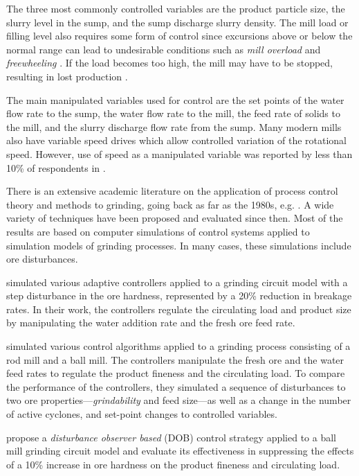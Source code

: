 The three most commonly controlled variables are the product particle size, the slurry level in the sump, and the sump discharge slurry density. The mill load or filling level also requires some form of control since excursions above or below the normal range can lead to undesirable conditions such as \textit{mill overload} and \textit{freewheeling} \citep{mcclure_overload_2015}. If the load becomes too high, the mill may have to be stopped, resulting in lost production \citep{wei_grinding_2009}.

The main manipulated variables used for control are the set points of the water flow rate to the sump, the water flow rate to the mill, the feed rate of solids to the mill, and the slurry discharge flow rate from the sump. Many modern mills also have variable speed drives which allow controlled variation of the rotational speed. However, use of speed as a manipulated variable was reported by less than 10\% of respondents in \cite{wei_grinding_2009}.

There is an extensive academic literature on the application of process control theory and methods to grinding, going back as far as the 1980s, e.g. \cite{herbst_optimal_1988}. A wide variety of techniques have been proposed and evaluated since then. Most of the results are based on computer simulations of control systems applied to simulation models of grinding processes. In many cases, these simulations include ore disturbances.

\cite{najim_adaptive_1995} simulated various adaptive controllers applied to a grinding circuit model with a step disturbance in the ore hardness, represented by a 20\% reduction in breakage rates. In their work, the controllers regulate the circulating load and product size by manipulating the water addition rate and the fresh ore feed rate.

\cite{pomerleau_survey_2000} simulated various control algorithms applied to a grinding process consisting of a rod mill and a ball mill. The controllers manipulate the fresh ore and the water feed rates to regulate the product fineness and the circulating load. To compare the performance of the controllers, they simulated a sequence of disturbances to two ore properties---\textit{grindability} and feed size---as well as a change in the number of active cyclones, and set-point changes to controlled variables.

\cite{chen_disturbance_2009} propose a \textit{disturbance observer based} (DOB) control strategy applied to a ball mill grinding circuit model and evaluate its effectiveness in suppressing the effects of a 10\% increase in ore hardness on the product fineness and circulating load.

